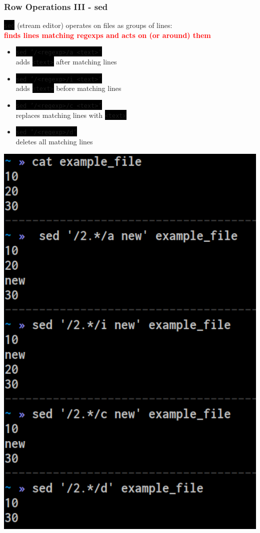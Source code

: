 \documentclass[unknownkeysallowed, 10pt, a4 paper, handout]{beamer}
\newcommand{\focus}[1]{\textbf{\textcolor{red}{#1}}}
\newcommand{\code}[1]{\colorbox{black}{\color{green}\texttt{#1}}}
\newcommand{\sidebyside}[5]{
  \begin{minipage}{#1\textwidth}
    #2
  \end{minipage} #3 \begin{minipage}{#4\textwidth}
    #5
  \end{minipage}
}
\begin{document}
\begin{frame}
  \begin{center}
    \frametitle{Row Operations III - sed}

    \code{sed} (stream editor) operates on files as groups of lines:\\
    \focus{finds lines matching regexps and acts on (or around) them}

    \sidebyside{0.60}{
      \begin{itemize}
        \item \code{sed '/<regexp>/a <text>'}\\
          adds \code{<text>} after matching lines
        \item \code{sed '/<regexp>/i <text>'}\\
          adds \code{<text>} before matching lines
        \item \code{sed '/<regexp>/c <text>'}\\
          replaces matching lines with \code{<text>}
        \item \code{sed '/<regexp>/d'}\\
          deletes all matching lines
      \end{itemize}
    }{\hfill}{0.38}{
      \begin{center}
        \includegraphics[width=1.00\textwidth]{pics/sed-1.png}
      \end{center}
    }
  \end{center}
\end{frame}
\end{document}
